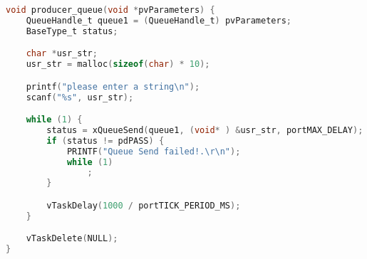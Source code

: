 \begin{lstlisting}[language=c,caption=Problem 2 Producer Queue, label=list:p2_prod]
void producer_queue(void *pvParameters) {
    QueueHandle_t queue1 = (QueueHandle_t) pvParameters;
    BaseType_t status;

    char *usr_str;
    usr_str = malloc(sizeof(char) * 10);

    printf("please enter a string\n");
    scanf("%s", usr_str);

    while (1) {
        status = xQueueSend(queue1, (void* ) &usr_str, portMAX_DELAY);
        if (status != pdPASS) {
            PRINTF("Queue Send failed!.\r\n");
            while (1)
                ;
        }

        vTaskDelay(1000 / portTICK_PERIOD_MS);
    }

    vTaskDelete(NULL);
}
\end{lstlisting}
